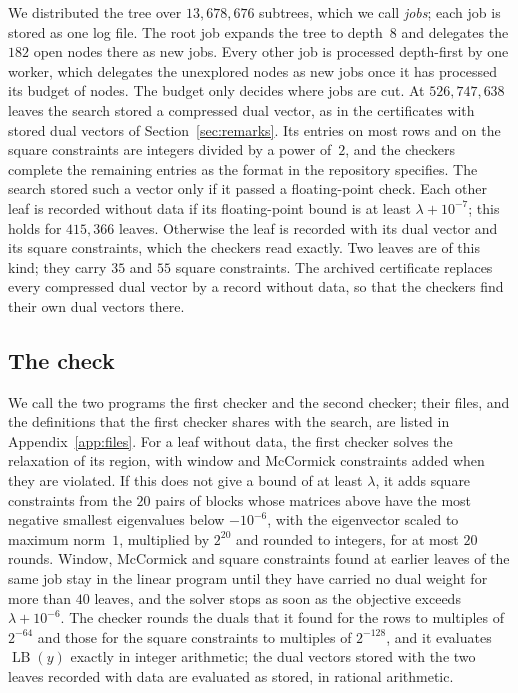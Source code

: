 \documentclass[11pt]{amsart}
\theoremstyle{definition}
\theoremstyle{remark}
\numberwithin{equation}{section}
\newcommand{\LB}{\operatorname{LB}}
\newcommand{\Njobs}{13{,}678{,}676}
\begin{document}
We distributed the tree over $\Njobs$ subtrees, which we call \emph{jobs}; each job is stored as one log file. The root job expands the tree to depth~$8$ and delegates the $182$ open nodes there as new jobs. Every other job is processed depth-first by one worker, which delegates the unexplored nodes as new jobs once it has processed its budget of nodes. The budget only decides where jobs are cut. At $526{,}747{,}638$ leaves the search stored a compressed dual vector, as in the certificates with stored dual vectors of Section~\ref{sec:remarks}. Its entries on most rows and on the square constraints are integers divided by a power of~$2$, and the checkers complete the remaining entries as the format in the repository specifies. The search stored such a vector only if it passed a floating-point check. Each other leaf is recorded without data if its floating-point bound is at least $\lambda+10^{-7}$; this holds for $415{,}366$ leaves. Otherwise the leaf is recorded with its dual vector and its square constraints, which the checkers read exactly. Two leaves are of this kind; they carry $35$ and $55$ square constraints. The archived certificate replaces every compressed dual vector by a record without data, so that the checkers find their own dual vectors there.

\subsection{The check} We call the two programs the first checker and the second checker; their files, and the definitions that the first checker shares with the search, are listed in Appendix~\ref{app:files}. For a leaf without data, the first checker solves the relaxation of its region, with window and McCormick constraints added when they are violated. If this does not give a bound of at least $\lambda$, it adds square constraints from the $20$ pairs of blocks whose matrices above have the most negative smallest eigenvalues below $-10^{-6}$, with the eigenvector scaled to maximum norm~$1$, multiplied by $2^{20}$ and rounded to integers, for at most $20$ rounds. Window, McCormick and square constraints found at earlier leaves of the same job stay in the linear program until they have carried no dual weight for more than $40$ leaves, and the solver stops as soon as the objective exceeds $\lambda+10^{-6}$. The checker rounds the duals that it found for the rows to multiples of $2^{-64}$ and those for the square constraints to multiples of $2^{-128}$, and it evaluates $\LB(y)$ exactly in integer arithmetic; the dual vectors stored with the two leaves recorded with data are evaluated as stored, in rational arithmetic.
\end{document}
